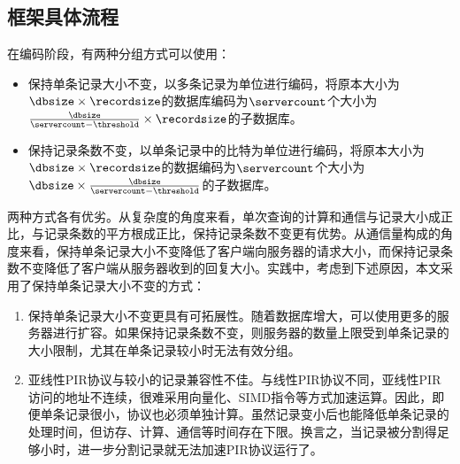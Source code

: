 \subsection{框架具体流程}
在编码阶段，有两种分组方式可以使用：
\begin{itemize}
    \item 保持单条记录大小不变，以多条记录为单位进行编码，将原本大小为$\dbsize\times\recordsize$的数据库编码为$\servercount$个大小为$\frac{\dbsize}{\servercount-\threshold}\times\recordsize$的子数据库。
    \item 保持记录条数不变，以单条记录中的比特为单位进行编码，将原本大小为$\dbsize\times\recordsize$的数据编码为$\servercount$个大小为$\dbsize\times\frac{\dbsize}{\servercount-\threshold}$的子数据库。
\end{itemize}

两种方式各有优劣。从复杂度的角度来看，单次查询的计算和通信与记录大小成正比，与记录条数的平方根成正比，保持记录条数不变更有优势。从通信量构成的角度来看，保持单条记录大小不变降低了客户端向服务器的请求大小，而保持记录条数不变降低了客户端从服务器收到的回复大小。实践中，考虑到下述原因，本文采用了保持单条记录大小不变的方式：
\begin{enumerate}
    \item 保持单条记录大小不变更具有可拓展性。随着数据库增大，可以使用更多的服务器进行扩容。如果保持记录条数不变，则服务器的数量上限受到单条记录的大小限制，尤其在单条记录较小时无法有效分组。
    \item 亚线性PIR协议与较小的记录兼容性不佳。与线性PIR协议不同，亚线性PIR访问的地址不连续，很难采用向量化、SIMD指令等方式加速运算。因此，即便单条记录很小，协议也必须单独计算。虽然记录变小后也能降低单条记录的处理时间，但访存、计算、通信等时间存在下限。换言之，当记录被分割得足够小时，进一步分割记录就无法加速PIR协议运行了。
\end{enumerate}

